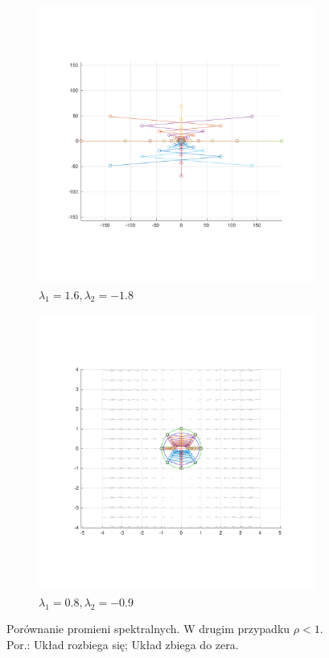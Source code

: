 \documentclass[]{article}
\begin{document}
\begin{figure}
	\centering
	\begin{subfigure}{.5\textwidth}
		\centering
		\includegraphics[width=0.99\linewidth]{normal_16_-18}
		\caption{$\lambda_1 = 1.6, \lambda_2 = -1.8$}
		\label{fig:normal1}
	\end{subfigure}%
	\begin{subfigure}{.5\textwidth}
		\centering
		\includegraphics[width=0.99\linewidth]{normal_08_-09}
		\caption{$\lambda_1 = 0.8, \lambda_2 = -0.9$}
		\label{fig:normal2}
	\end{subfigure}
	\caption{Porównanie promieni spektralnych. W drugim przypadku $\rho < 1$. Por.: Układ rozbiega się; Układ zbiega do zera.}
	\label{fig2}
\end{figure}
\end{document}
